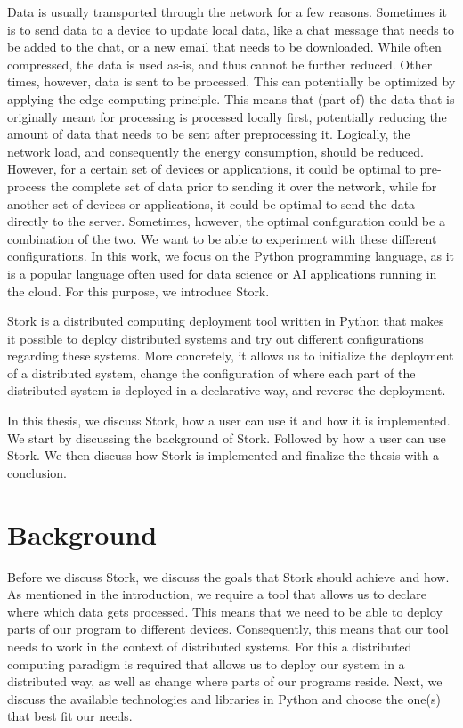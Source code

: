 \documentclass[a4paper]{article}
\begin{document}
Data is usually transported through the network for a few reasons. Sometimes it is to send data to a device to update local data, like a chat message that needs to be added to the chat, or a new email that needs to be downloaded. While often compressed, the data is used as-is, and thus cannot be further reduced. Other times, however, data is sent to be processed. This can potentially be optimized by applying the edge-computing principle. This means that (part of) the data that is originally meant for processing is processed locally first, potentially reducing the amount of data that needs to be sent after preprocessing it. Logically, the network load, and consequently the energy consumption, should be reduced. However, for a certain set of devices or applications, it could be optimal to pre-process the complete set of data prior to sending it over the network, while for another set of devices or applications, it could be optimal to send the data directly to the server. Sometimes, however, the optimal configuration could be a combination of the two. We want to be able to experiment with these different configurations. In this work, we focus on the Python programming language, as it is a popular language often used for data science or AI applications running in the cloud. For this purpose, we introduce Stork.

Stork is a distributed computing deployment tool written in Python that makes it possible to deploy distributed systems and try out different configurations regarding these systems. More concretely, it allows us to initialize the deployment of a distributed system, change the configuration of where each part of the distributed system is deployed in a declarative way, and reverse the deployment.

In this thesis, we discuss Stork, how a user can use it and how it is implemented. We start by discussing the background of Stork. Followed by how a user can use Stork. We then discuss how Stork is implemented and finalize the thesis with a conclusion.
\section{Background}
Before we discuss Stork, we discuss the goals that Stork should achieve and how. As mentioned in the introduction, we require a tool that allows us to declare where which data gets processed. This means that we need to be able to deploy parts of our program to different devices. Consequently, this means that our tool needs to work in the context of distributed systems. For this a distributed computing paradigm is required that allows us to deploy our system in a distributed way, as well as change where parts of our programs reside. Next, we discuss the available technologies and libraries in Python and choose the one(s) that best fit our needs.
\end{document}
